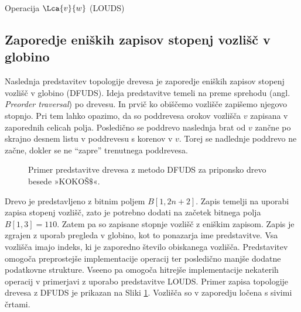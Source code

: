 \begin{algorithm}[hbt]

\caption{Operacija $\Lca{v}{w}$ (LOUDS)}\label{alg:LOUDSlca}
{
    
}
\end{algorithm}


\subsection{Zaporedje eniških zapisov stopenj vozlišč v globino}\label{sec:DFUDS}

Naslednja predstavitev topologije drevesa je zaporedje eniških zapisov stopenj vozlišč v globino (DFUDS). Ideja predstavitve temeli na preme sprehodu (angl. \textit{Preorder traversal}) po drevesu. In prvič ko obiščemo vozlišče zapišemo njegovo stopnjo. Pri tem lahko opazimo, da so poddrevesa orokov vozlišča $v$ zapisana v zaporednih celicah polja. Posledično se poddrevo naslednja brat od $v$ zančne po skrajno desnem listu v poddrevesu s korenov v $v$. Torej se nadlednje poddrevo ne začne, dokler se ne \enquote{zapre} trenutnega poddrevesa. 
\begin{figure}[htb]
    \begin{center}
        
        \caption{Primer predstavitve drevesa z metodo DFUDS za priponsko drevo besede »KOKOŠ$\$$«.} 
        \label{fig:DFUDS}
    \end{center}
\end{figure}

Drevo je predstavljeno z bitnim poljem $B[1,2n+2]$. Zapis temelji na uporabi zapisa stopenj vozlišč, zato je potrebno dodati na začetek bitnega polja $B[1,3]=110$. Zatem pa so zapisane stopnje vozlišč z eniškim zapisom. Zapis je zgrajen z uporab pregleda v globino, kot to ponazarja ime predstavitve. Vsa vozlišča imajo indeks, ki je zaporedno število obiskanega vozlišča. Predstavitev omogoča preprostejše implementacije operacij ter posledično manjše dodatne podatkovne strukture. Vseeno pa omogoča hitrejše implementacije nekaterih operacij v primerjavi z uporabo predstavitve LOUDS. Primer zapisa topologije drevesa z DFUDS je prikazan na Sliki \ref{fig:DFUDS}. Vozlišča so v zaporedju ločena s sivimi črtami.

